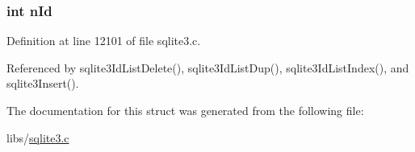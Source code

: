 \subsubsection[{n\+Id}]{\setlength{\rightskip}{0pt plus 5cm}int n\+Id}\label{struct_id_list_a704996c74087cf2da6dc57c77927c755}


Definition at line 12101 of file sqlite3.\+c.



Referenced by sqlite3\+Id\+List\+Delete(), sqlite3\+Id\+List\+Dup(), sqlite3\+Id\+List\+Index(), and sqlite3\+Insert().



The documentation for this struct was generated from the following file\+:\begin{DoxyCompactItemize}
\item 
libs/\hyperlink{sqlite3_8c}{sqlite3.\+c}\end{DoxyCompactItemize}
